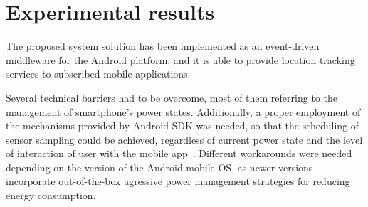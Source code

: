 \documentclass[ENG,PhD]{cinvestav}
\begin{document}
 
%                                                                                                                                                             
\section{Experimental results}\label{sec:experimental-results}
The proposed system solution has been implemented as an event-driven middleware for the Android platform, and it is able to provide location tracking services to subscribed mobile applications.

Several technical barriers had to be overcome, most of them referring to the management of smartphone's power states.
Additionally, a proper employment of the mechanisms provided by Android SDK was needed, so that the scheduling of sensor sampling could be achieved, regardless of current power state and the level of interaction of user with the mobile app~\cite{Perez-Torres2016b,Android2016b}.
Different workarounds were needed depending on the version of the Android mobile OS, as newer versions incorporate out-of-the-box agressive power management strategies for reducing energy consumption.
\end{document}
